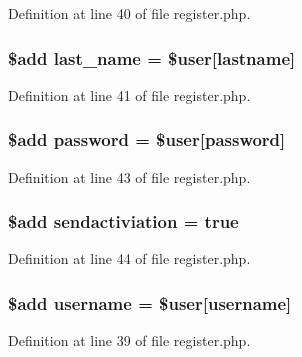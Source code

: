 Definition at line 40 of file register.\+php.

\subsubsection[{\texorpdfstring{last\+\_\+name}{last_name}}]{\setlength{\rightskip}{0pt plus 5cm}\${\bf add} last\+\_\+name = \${\bf user}\mbox{[}\textquotesingle{}lastname\textquotesingle{}\mbox{]}}\hypertarget{register_8php_ad28df3187bc8c49657d3800bb449f939}{}\label{register_8php_ad28df3187bc8c49657d3800bb449f939}


Definition at line 41 of file register.\+php.

\subsubsection[{\texorpdfstring{password}{password}}]{\setlength{\rightskip}{0pt plus 5cm}\${\bf add} password = \${\bf user}\mbox{[}\textquotesingle{}password\textquotesingle{}\mbox{]}}\hypertarget{register_8php_a3ef39d3ee8b2bcca6a288308549ccb44}{}\label{register_8php_a3ef39d3ee8b2bcca6a288308549ccb44}


Definition at line 43 of file register.\+php.

\subsubsection[{\texorpdfstring{sendactiviation}{sendactiviation}}]{\setlength{\rightskip}{0pt plus 5cm}\${\bf add} sendactiviation = true}\hypertarget{register_8php_a11fe66faec6579a15979e62879ba8950}{}\label{register_8php_a11fe66faec6579a15979e62879ba8950}


Definition at line 44 of file register.\+php.

\subsubsection[{\texorpdfstring{username}{username}}]{\setlength{\rightskip}{0pt plus 5cm}\${\bf add} username = \${\bf user}\mbox{[}\textquotesingle{}username\textquotesingle{}\mbox{]}}\hypertarget{register_8php_ac9b3768ccc688c2ff0811c50c107a02e}{}\label{register_8php_ac9b3768ccc688c2ff0811c50c107a02e}


Definition at line 39 of file register.\+php.

